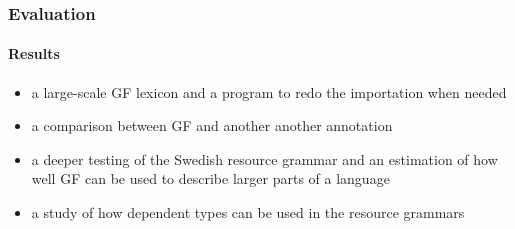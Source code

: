 \documentclass[10pt]{beamer}
\renewcommand{\baselinestretch}{1.5}
\begin{document}
%
%
%

\begin{frame}
 \renewcommand{\baselinestretch}{1.0}
\frametitle{Evaluation}
\framesubtitle{Results} 
\begin{itemize}
\item a large-scale GF lexicon and a program to redo the importation when needed
\item a comparison between GF and another another annotation
\item a deeper testing of the Swedish resource grammar and an estimation
of how well GF can be used to describe larger parts of a language
\item a study of how dependent types can be used in the resource grammars
\end{itemize}
\end{frame}




\end{document}
